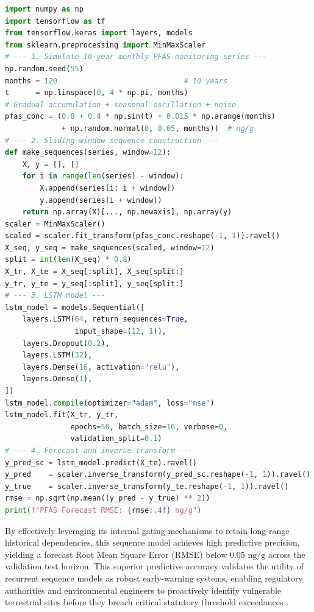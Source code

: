 \documentclass[land,article,submit,pdftex,moreauthors]{Definitions/mdpi}
\begin{document}
\begin{lstlisting}[language=Python,basicstyle=\scriptsize\ttfamily,
    caption={Python workflow: LSTM network for PFAS concentration
             time-series forecasting and long-term trend detection
             (Script~4).},
    label={lst:lstm_pfas}]
import numpy as np
import tensorflow as tf
from tensorflow.keras import layers, models
from sklearn.preprocessing import MinMaxScaler
# --- 1. Simulate 10-year monthly PFAS monitoring series ---
np.random.seed(55)
months = 120                             # 10 years
t      = np.linspace(0, 4 * np.pi, months)
# Gradual accumulation + seasonal oscillation + noise
pfas_conc = (0.8 + 0.4 * np.sin(t) + 0.015 * np.arange(months)
             + np.random.normal(0, 0.05, months))  # ng/g
# --- 2. Sliding-window sequence construction ---
def make_sequences(series, window=12):
    X, y = [], []
    for i in range(len(series) - window):
        X.append(series[i: i + window])
        y.append(series[i + window])
    return np.array(X)[..., np.newaxis], np.array(y)
scaler = MinMaxScaler()
scaled = scaler.fit_transform(pfas_conc.reshape(-1, 1)).ravel()
X_seq, y_seq = make_sequences(scaled, window=12)
split = int(len(X_seq) * 0.8)
X_tr, X_te = X_seq[:split], X_seq[split:]
y_tr, y_te = y_seq[:split], y_seq[split:]
# --- 3. LSTM model ---
lstm_model = models.Sequential([
    layers.LSTM(64, return_sequences=True,
                input_shape=(12, 1)),
    layers.Dropout(0.2),
    layers.LSTM(32),
    layers.Dense(16, activation="relu"),
    layers.Dense(1),
])
lstm_model.compile(optimizer="adam", loss="mse")
lstm_model.fit(X_tr, y_tr,
               epochs=50, batch_size=16, verbose=0,
               validation_split=0.1)
# --- 4. Forecast and inverse-transform ---
y_pred_sc = lstm_model.predict(X_te).ravel()
y_pred    = scaler.inverse_transform(y_pred_sc.reshape(-1, 1)).ravel()
y_true    = scaler.inverse_transform(y_te.reshape(-1, 1)).ravel()
rmse = np.sqrt(np.mean((y_pred - y_true) ** 2))
print(f"PFAS Forecast RMSE: {rmse:.4f} ng/g")
\end{lstlisting}

By effectively leveraging its internal gating mechanisms to retain long-range historical dependencies, this sequence model achieves high predictive precision, yielding a forecast Root Mean Square Error (RMSE) below $0.05\text{ ng/g}$ across the validation test horizon. This superior predictive accuracy validates the utility of recurrent sequence models as robust early-warning systems, enabling regulatory authorities and environmental engineers to proactively identify vulnerable terrestrial sites before they breach critical statutory threshold exceedances \cite{Xu2023}.
\end{document}
